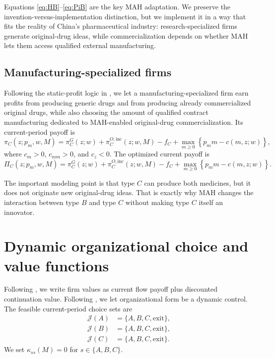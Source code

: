 \documentclass[12pt]{article}
\newcommand{\1}{\mathbf{1}}
\begin{document}
Equations \eqref{eq:HB}--\eqref{eq:PiB} are the key MAH adaptation. We preserve the invention-versus-implementation distinction, but we implement it in a way that fits the reality of China's pharmaceutical industry: research-specialized firms generate original-drug ideas, while commercialization depends on whether MAH lets them access qualified external manufacturing.

\subsection{Manufacturing-specialized firms}

Following the static-profit logic in \citet{Hopenhayn1992}, we let a manufacturing-specialized firm earn profits from producing generic drugs and from producing already commercialized original drugs, while also choosing the amount of qualified contract manufacturing dedicated to MAH-enabled original-drug commercialization. Its current-period payoff is
\begin{equation}
\pi_C(z;p_m,w,M)
=
\pi_C^G(z;w)
+\pi_C^{O,\mathrm{inc}}(z;w,M)
-f_C
+\max_{m\ge 0}\left\{p_m m-c(m,z;w)\right\},
\label{eq:piC}
\end{equation}
where $c_m>0$, $c_{mm}>0$, and $c_z<0$. The optimized current payoff is
\begin{equation}
\Pi_C(z;p_m,w,M)
=
\pi_C^G(z;w)
+\pi_C^{O,\mathrm{inc}}(z;w,M)
-f_C
+\max_{m\ge 0}\left\{p_m m-c(m,z;w)\right\}.
\label{eq:PiC}
\end{equation}

The important modeling point is that type $C$ can produce both medicines, but it does not originate new original-drug ideas. That is exactly why MAH changes the interaction between type $B$ and type $C$ without making type $C$ itself an innovator.

\section{Dynamic organizational choice and value functions}

Following \citet{Hopenhayn1992}, we write firm values as current flow payoff plus discounted continuation value. Following \citet{EricsonPakes1995}, we let organizational form be a dynamic control. The feasible current-period choice sets are
\begin{align}
\mathcal J(A)&=\{A,B,C,\text{exit}\}, \\
\mathcal J(B)&=\{A,B,C,\text{exit}\}, \\
\mathcal J(C)&=\{A,B,C,\text{exit}\}.
\end{align}
We set $\kappa_{ss}(M)=0$ for $s\in\{A,B,C\}$.
\end{document}
